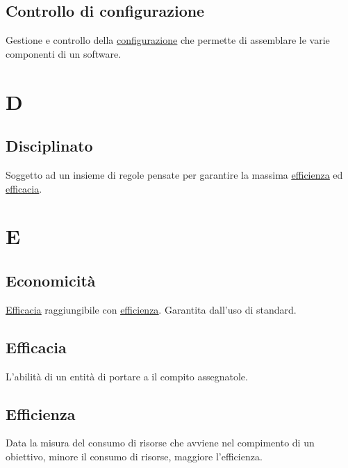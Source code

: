 	\subsection{Controllo di configurazione}
	\label{sec:controlloconfigurazione}
	Gestione e controllo della \underline{\hyperref[sec:configurazione]{configurazione}} che permette di assemblare le varie componenti di un software.\newpage

	
	\section{D}

	\subsection{Disciplinato}
	\label{sec:disciplinato}
	Soggetto ad un insieme di regole pensate per garantire la massima \underline{\hyperref[sec:efficienza]{efficienza}} ed \underline{\hyperref[sec:efficacia]{efficacia}}.\newpage

	
	\section{E}
	\subsection{Economicità}
	\label{sec:economicita}
	\underline{\hyperref[sec:efficacia]{Efficacia}} raggiungibile con \underline{\hyperref[sec:efficienza]{efficienza}}. Garantita dall'uso di standard.
	
	\subsection{Efficacia}
	\label{sec:efficacia}
	L'abilità di un entità di portare a il compito assegnatole.
	
	\subsection{Efficienza}
	\label{sec:efficienza}
	Data la misura del consumo di risorse che avviene nel compimento di un obiettivo, minore il consumo di risorse, maggiore l'efficienza.\newpage

